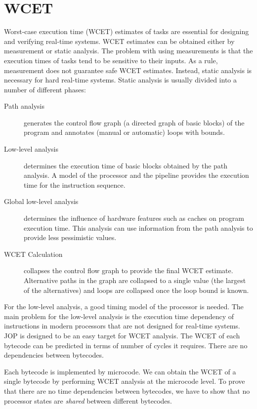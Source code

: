 \section{WCET}
\label{sec:wcet}

Worst-case execution time (WCET) estimates of tasks are essential
for designing and verifying real-time systems. WCET estimates can be
obtained either by measurement or static analysis. The problem with
using measurements is that the execution times of tasks tend to be
sensitive to their inputs. As a rule, measurement does not guarantee
safe WCET estimates. Instead, static analysis is necessary for hard
real-time systems. Static analysis is usually divided into a number
of different phases:
%
\begin{description}
    \item[Path analysis] generates the control flow graph (a directed
    graph of basic blocks) of the program and annotates (manual or
    automatic) loops with bounds.
    \item[Low-level analysis] determines the execution time of basic
    blocks obtained by the path analysis. A model of the processor
    and the pipeline provides the execution time for the instruction
    sequence.
    \item[Global low-level analysis] determines the influence of
    hardware features such as caches on program execution time. This
    analysis can use information from the path analysis to provide less
    pessimistic values.
    \item[WCET Calculation] collapses the control flow graph to
    provide the final WCET estimate. Alternative paths in the graph
    are collapsed to a single value (the largest of the alternatives)
    and loops are collapsed once the loop bound is known.
\end{description}
%
For the low-level analysis, a good timing model of the processor is
needed. The main problem for the low-level analysis is the execution
time dependency of instructions in modern processors that are not
designed for real-time systems. JOP is designed to be an easy target
for WCET analysis. The WCET of each bytecode can be predicted in
terms of number of cycles it requires. There are no dependencies
between bytecodes.

Each bytecode is implemented by microcode. We can obtain the WCET of
a single bytecode by performing WCET analysis at the microcode
level. To prove that there are no time dependencies between
bytecodes, we have to show that no processor states are
\emph{shared} between different bytecodes.

